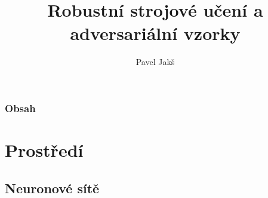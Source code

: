 \documentclass[czech]{beamer}
\title{Robustní strojové učení a adversariální vzorky}
\author{Pavel Jakš}
\institute{Matematická informatika, FJFI ČVUT v Praze}
\begin{document}

\frame{\titlepage}

\begin{frame}
    \frametitle{Obsah}
    \tableofcontents
\end{frame}

\section{Prostředí}

\subsection{Neuronové sítě}


\end{document}
